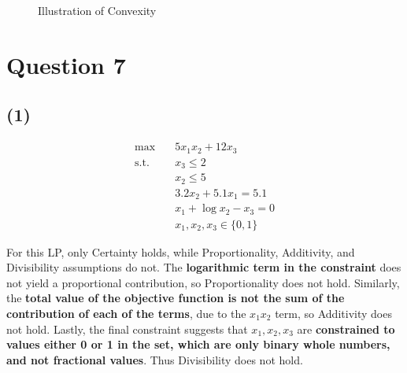 \documentclass[12pt]{article}
\begin{document}
\begin{figure}[H]
    \centering
    \caption{Illustration of Convexity}
    \label{fig:6-convexfns}
\end{figure} 

\section*{Question 7}

\subsection*{(1)}
\begin{align*}
    \max \quad & 5x_{1} x_{2} + 12 x_{3} \\ 
    \text{s.t.} \quad & x_{3} \leq 2 \\ 
    & x_{2} \leq 5 \\ 
    & 3.2 x_{2} + 5.1 x_{1} = 5.1 \\ 
    & x_{1} + \log x_{2} - x_{3} = 0 \\ 
    & x_{1}, x_{2}, x_{3} \in \{0,1\}
\end{align*}

\noindent For this LP, only Certainty holds, while Proportionality, Additivity, and Divisibility assumptions do not. The \textbf{logarithmic term in the constraint} does not yield a proportional contribution, so Proportionality does not hold. Similarly, the \textbf{total value of the objective function is not the sum of the contribution of each of the terms}, due to the $x_1 x_2$ term, so Additivity does not hold. Lastly, the final constraint suggests that $x_1, x_2, x_3$ are \textbf{constrained to values either 0 or 1 in the set, which are only binary whole numbers, and not fractional values}. Thus Divisibility does not hold.  
\end{document}
